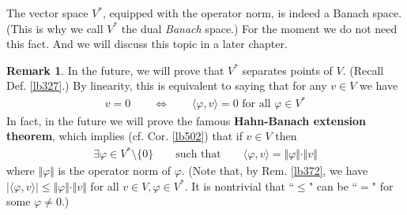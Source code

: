 \documentclass[12pt,b5paper,notitlepage]{article}
\theoremstyle{definition}
\newtheorem{rem}[df]{Remark}
\theoremstyle{plain}
\newcommand{\fk}{\mathfrak}
\newcommand{\ovl}{\overline}
\newcommand{\bk}[1]{\langle {#1}\rangle}
\numberwithin{equation}{section}
\begin{document}
The vector space $V^*$, equipped with the operator norm, is indeed a Banach space. (This is why we call $V^*$ the dual \textit{Banach} space.) For the moment we do not need this fact. And we will discuss this topic in a later chapter.



\begin{rem}\label{lb393}
In the future, we will prove that $V^*$ separates points of $V$. (Recall Def. \ref{lb327}.) By linearity, this is equivalent to saying that for any $v\in V$ we have
\begin{align}\label{eq115}
v=0\qquad\Longleftrightarrow\qquad\bk{\varphi,v}=0\text{ for all }\varphi\in V^*
\end{align}
In fact, in the future we will prove the famous \textbf{Hahn-Banach extension theorem}, which implies (cf. Cor. \ref{lb502}) that if $v\in V$ then
\begin{align}
\exists \varphi\in V^*\setminus\{0\}\qquad\text{such that}\qquad\bk{\varphi,v}=\Vert\varphi\Vert\cdot\Vert v\Vert \label{eq116}
\end{align}
where $\Vert\varphi\Vert$ is the operator norm of $\varphi$. (Note that, by Rem. \ref{lb372}, we have $|\bk{\varphi,v}|\leq\Vert\varphi\Vert\cdot\Vert v\Vert$ for all $v\in V,\varphi\in V^*$. It is nontrivial that ``$\leq$" can be ``$=$" for some $\varphi\neq0$.) 
\end{rem}




\begin{comment}
From \eqref{eq118}, it is clear that for any $v\in V,\varphi\in V^*$ we have
\begin{align}
|\bk{\varphi,v}|\leq\Vert\varphi\Vert\cdot\Vert v\Vert \label{eq119}
\end{align}
Thus, the inequality ``$\geq$" trivially holds in \eqref{eq116}. The ``$\leq$" in \eqref{eq116} is nontrivial. 

\begin{rem}\label{lb328}
If we equip the \textbf{double dual space} \index{00@Double dual space $V^{**}$} $V^{**}=(V^*)^*$ \index{V@$V^{**}=(V^*)^*$} with the operator norm, then for each $\fk v\in V^{**}$, by \eqref{eq120} we have
\begin{align*}
\Vert\fk v\Vert=\sup_{\varphi\in \ovl B_{V^*}(0,1)}|\bk{\fk v,\varphi}|
\end{align*}
From this relation, it is clear that \eqref{eq116} holds if and only if the canonical linear map 
\begin{gather}
V\rightarrow V^{**}\qquad v\mapsto \bk{\cdot ,v}  \label{eq117}
\end{gather} 
(where $\bk{\cdot,v}$ sends each $\varphi\in V^*$ to $\bk{\varphi,v}=\varphi(v)$) is an isometry.
\end{rem}

\end{comment}
\end{document}
